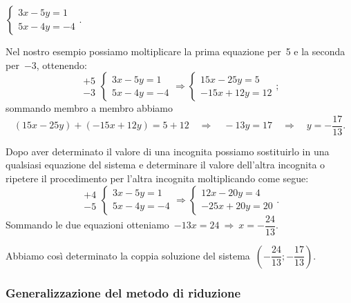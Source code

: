 \begin{exrig}
 \begin{esempio}
$\left\{\begin{array}{l}3x-5y=1\\5x-4y=-4\end{array}\right..$

Nel nostro esempio possiamo moltiplicare la prima equazione per~5 e la
seconda per~$-3$, ottenendo:
 \[\begin{array}{l}+5\\-3\end{array}
 \left\{\begin{array}{l}3x-5y=1\\5x-4y=-4\end{array}\right.\Rightarrow
 \left\{\begin{array}{l}15x-25y=5\\-15x+12y=12\end{array}\right.;\]
sommando membro a membro abbiamo
\begin{equation*}
(15x-25y)+(-15x+12y)=5+12\quad\Rightarrow\quad -13y=17\quad\Rightarrow\quad
y=-{\frac{17}{13}}.
\end{equation*}

Dopo aver determinato il valore di una incognita possiamo sostituirlo in
una qualsiasi equazione del sistema e determinare il valore
dell'altra incognita o ripetere il procedimento per l'altra incognita moltiplicando come segue:
\[\begin{array}{l}+4\\-5\end{array}\left\{\begin{array}{l}3x-5y=1\\5x-4y=-4\end{array}\right.
\Rightarrow\left\{\begin{array}{l}12x-20y=4\\-25x+20y=20\end{array}\right..\]
Sommando le due equazioni otteniamo~$-13x=24\:\Rightarrow\: x=-{\dfrac{24}{13}}$.

Abbiamo così determinato la coppia soluzione del sistema~$\left(-{\dfrac{24}{13}};-\dfrac{17}{13}\right)$.
 \end{esempio}
\end{exrig}

\subsubsection{Generalizzazione del metodo di riduzione}

